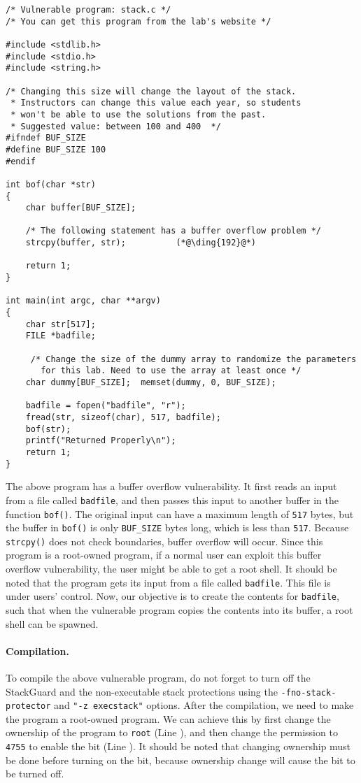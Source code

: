 \begin{lstlisting}
/* Vulnerable program: stack.c */
/* You can get this program from the lab's website */

#include <stdlib.h>
#include <stdio.h>
#include <string.h>

/* Changing this size will change the layout of the stack.
 * Instructors can change this value each year, so students
 * won't be able to use the solutions from the past.
 * Suggested value: between 100 and 400  */
#ifndef BUF_SIZE
#define BUF_SIZE 100
#endif

int bof(char *str)
{
    char buffer[BUF_SIZE];

    /* The following statement has a buffer overflow problem */ 
    strcpy(buffer, str);          (*@\ding{192}@*)

    return 1;
}

int main(int argc, char **argv)
{
    char str[517];
    FILE *badfile;

     /* Change the size of the dummy array to randomize the parameters
       for this lab. Need to use the array at least once */
    char dummy[BUF_SIZE];  memset(dummy, 0, BUF_SIZE); 

    badfile = fopen("badfile", "r");
    fread(str, sizeof(char), 517, badfile);
    bof(str);
    printf("Returned Properly\n");
    return 1;
}
\end{lstlisting}

The above program has a buffer overflow vulnerability. It first 
reads an input from a file called \texttt{badfile}, and then passes this
input to another buffer in the function {\tt bof()}. The 
original input can have a maximum length of \texttt{517} bytes, but the buffer
in {\tt bof()} is only \texttt{BUF\_SIZE} bytes long, which is less than
\texttt{517}. 
Because {\tt strcpy()} does not check
boundaries, buffer overflow will occur.
Since this program is a root-owned \setuid program, if a normal user can exploit
this buffer overflow vulnerability, the user might be 
able to get a root shell.
It should be noted that 
the program gets its input from a file called \texttt{badfile}. This file
is under users' control. Now, our objective is to 
create the contents for \texttt{badfile}, such that when the vulnerable program
copies the contents into its buffer, a root shell can be spawned.


\paragraph{Compilation.}
To compile the above vulnerable program, do not forget to 
turn off the StackGuard and the non-executable stack protections 
using the \texttt{-fno-stack-protector} and \texttt{"-z execstack"} options.
After the compilation, we need to make the program a
root-owned \setuid program. We can achieve this by first change the ownership of the program to
\texttt{root} (Line ), and then change the permission to \texttt{4755} to enable the
\setuid bit (Line ). It should be noted that changing ownership must be done before
turning on the \setuid bit, because ownership change will cause the \setuid bit to be turned
off.


